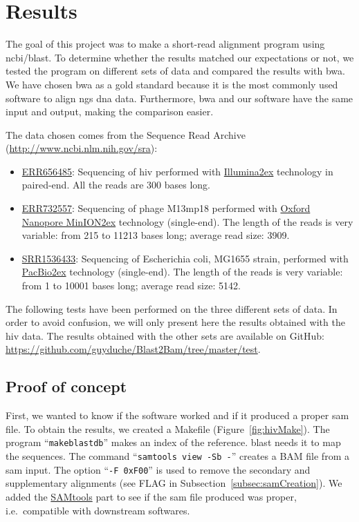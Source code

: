 \chapter{Results}\label{ch:results}
The goal of this project was to make a short-read alignment program using \gls{ncbi}\slash\gls{blast}.
To determine whether the results matched our expectations or not, we tested the program on different sets of data and compared the results with \gls{bwa}.
We have chosen \gls{bwa} as a gold standard because it is the most commonly used software to align \gls{ngs} \gls{dna} data.
Furthermore, \gls{bwa} and our software have the same input and output, making the comparison easier.

The data chosen comes from the Sequence Read Archive (\url{http://www.ncbi.nlm.nih.gov/sra}):
\begin{itemize}
    \item \href{http://www.ncbi.nlm.nih.gov/sra/ERR656485}{ERR656485}: Sequencing of \gls{hiv} performed with \href{http://www.illumina.com/}{Illumina\ttfamily\tiny\raise 2ex\hbox{\textregistered}} technology in paired-end. All the reads are 300 bases long.
    \item \href{http://www.ncbi.nlm.nih.gov/sra/ERR732557}{ERR732557}: Sequencing of phage M13mp18 performed with \href{https://nanoporetech.com/products-services/minion-mki}{Oxford Nanopore MinION\ttfamily\tiny\raise 2ex\hbox{\texttrademark}} technology (single-end). The length of the reads is very variable: from 215 to 11213 bases long; average read size: 3909.
    \item \href{http://www.ncbi.nlm.nih.gov/sra/SRR1536433}{SRR1536433}: Sequencing of Escherichia coli, MG1655 strain, performed with \href{http://www.pacificbiosciences.com/}{PacBio\ttfamily\tiny\raise 2ex\hbox{\textregistered}} technology (single-end). The length of the reads is very variable: from 1 to 10001 bases long; average read size: 5142.
\end{itemize}

The following tests have been performed on the three different sets of data.
In order to avoid confusion, we will only present here the results obtained with the \gls{hiv} data.
The results obtained with the other sets are available on GitHub: \url{https://github.com/guyduche/Blast2Bam/tree/master/test}.


\section{Proof of concept}
First, we wanted to know if the software worked and if it produced a proper \gls{sam} file.
To obtain the results, we created a Makefile (Figure~\ref{fig:hivMake}).
The program ``\texttt{makeblastdb}'' makes an index of the reference. \gls{blast} needs it to map the sequences.
The command ``\texttt{samtools view -Sb -}'' creates a BAM file from a \gls{sam} input.
The option ``\texttt{-F 0xF00}'' is used to remove the secondary and supplementary alignments (see FLAG in Subsection~\ref{subsec:samCreation}).
We added the \href{http://www.htslib.org/}{SAMtools} part to see if the \gls{sam} file produced was proper, i.e.~compatible with downstream softwares.

